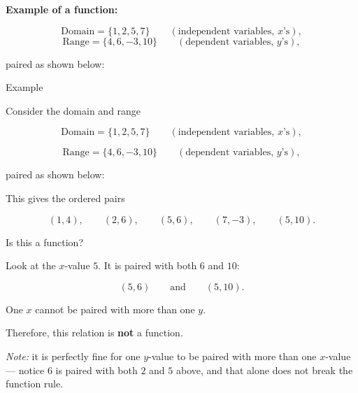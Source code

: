 \documentclass[12pt]{article}
\newcounter{examplenum}
\newenvironment{friendlyex}{%
    \refstepcounter{examplenum}%
    \begin{friendlyexbox}{Example \theexamplenum}%
}{%
    \end{friendlyexbox}%
}
\begin{document}
\textbf{Example of a function:}

\[
\text{Domain}=\{1,2,5,7\}\qquad(\text{independent variables, }x\text{'s}),
\]
\[
\text{Range}=\{4,6,-3,10\}\qquad(\text{dependent variables, }y\text{'s}),
\]

paired as shown below:

\begin{center}
\end{center}

\begin{friendlyex}
Consider the domain and range

\[
\text{Domain}=\{1,2,5,7\}\qquad(\text{independent variables, }x\text{'s}),
\]

\[
\text{Range}=\{4,6,-3,10\}\qquad(\text{dependent variables, }y\text{'s}),
\]

paired as shown below:

\begin{center}
\end{center}

This gives the ordered pairs

\[
(1,4),\qquad (2,6),\qquad (5,6),\qquad (7,-3),\qquad (5,10).
\]

Is this a function?
\end{friendlyex}

 

\begin{solutionbox}
Look at the $x$-value $5$. It is paired with both $6$ and $10$:

\[
(5,6)\qquad\text{and}\qquad (5,10).
\]

One $x$ cannot be paired with more than one $y$.

Therefore, this relation is \textbf{not} a function.

\emph{Note:} it is perfectly fine for one $y$-value to be paired with more than one $x$-value --- notice $6$ is paired with both $2$ and $5$ above, and that alone does not break the function rule.
\end{solutionbox}
\end{document}
